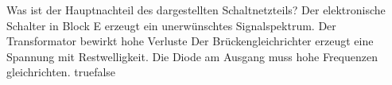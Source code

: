     {Was ist der Hauptnachteil des dargestellten Schaltnetzteils?}
    {Der elektronische Schalter in Block E erzeugt ein unerwünschtes Signalspektrum.}
    {Der Transformator bewirkt hohe Verluste}
    {Der Brückengleichrichter erzeugt eine Spannung mit Restwelligkeit.}
    {Die Diode am Ausgang muss hohe Frequenzen gleichrichten.}
    {true}{false}
